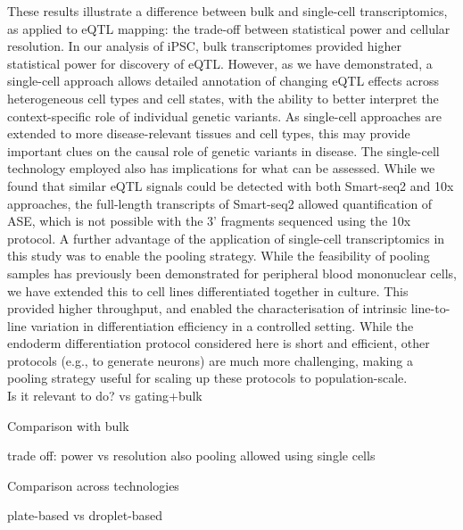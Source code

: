 These results illustrate a difference between bulk and single-cell transcriptomics, as applied to eQTL mapping: the trade-off between statistical power and cellular resolution. 
In our analysis of iPSC, bulk transcriptomes provided higher statistical power for
discovery of eQTL. 
However, as we have demonstrated, a single-cell approach allows detailed annotation of changing eQTL effects across heterogeneous cell types and cell states, with the ability to better interpret the context-specific role of individual genetic
variants. 
As single-cell approaches are extended to more disease-relevant tissues and cell types, this may provide important clues on the causal role of genetic variants in disease. 
The single-cell technology employed also has implications for what can be assessed. 
While we found that similar eQTL signals could be detected with both Smart-seq2 and 10x approaches, the full-length transcripts of Smart-seq2 allowed quantification of ASE, which is not possible with the 3' fragments sequenced using the 10x protocol.
A further advantage of the application of single-cell transcriptomics in this study was to enable the pooling strategy. 
While the feasibility of pooling samples has previously been demonstrated for peripheral blood mononuclear cells\cite{kang2018multiplexed}, we have extended this to cell lines differentiated together in culture. 
This provided higher throughput, and enabled the characterisation of intrinsic line-to-line variation in differentiation efficiency in a controlled setting. 
While the endoderm differentiation protocol considered here is short and efficient, other protocols (e.g., to generate neurons\cite{tao2016neural}) are much more challenging, making a pooling strategy useful for scaling up these protocols to population-scale.\\


Is it relevant to do? 
vs gating+bulk


Comparison with bulk

trade off: power vs resolution
also pooling allowed using single cells

Comparison across technologies

plate-based vs droplet-based

